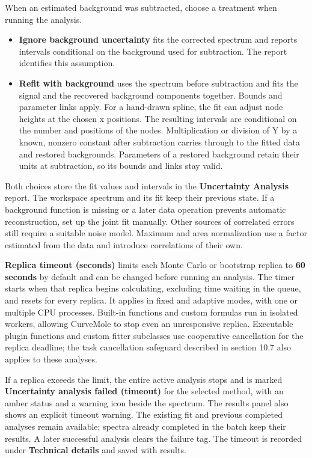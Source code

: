 \documentclass[
  10pt,
  a4paper,
  oneside]{scrreprt}
\providecommand{\tightlist}{%
  \setlength{\itemsep}{0pt}\setlength{\parskip}{0pt}}
\begin{document}
When an estimated background was subtracted, choose a treatment when
running the analysis.

\begin{itemize}
\tightlist
\item
  \textbf{Ignore background uncertainty} fits the corrected spectrum and
  reports intervals conditional on the background used for subtraction.
  The report identifies this assumption.
\item
  \textbf{Refit with background} uses the spectrum before subtraction
  and fits the signal and the recovered background components together.
  Bounds and parameter links apply. For a hand-drawn spline, the fit can
  adjust node heights at the chosen x positions. The resulting intervals
  are conditional on the number and positions of the nodes.
  Multiplication or division of Y by a known, nonzero constant after
  subtraction carries through to the fitted data and restored
  backgrounds. Parameters of a restored background retain their units at
  subtraction, so its bounds and links stay valid.
\end{itemize}

Both choices store the fit values and intervals in the
\textbf{Uncertainty Analysis} report. The workspace spectrum and its fit
keep their previous state. If a background function is missing or a
later data operation prevents automatic reconstruction, set up the joint
fit manually. Other sources of correlated errors still require a
suitable noise model. Maximum and area normalization use a factor
estimated from the data and introduce correlations of their own.

\textbf{Replica timeout (seconds)} limits each Monte Carlo or bootstrap
replica to \textbf{60 seconds} by default and can be changed before
running an analysis. The timer starts when that replica begins
calculating, excluding time waiting in the queue, and resets for every
replica. It applies in fixed and adaptive modes, with one or multiple
CPU processes. Built-in functions and custom formulas run in isolated
workers, allowing CurveMole to stop even an unresponsive replica.
Executable plugin functions and custom fitter subclasses use cooperative
cancellation for the replica deadline; the task cancellation safeguard
described in section 10.7 also applies to these analyses.

If a replica exceeds the limit, the entire active analysis stops and is
marked \textbf{Uncertainty analysis failed (timeout)} for the selected
method, with an amber status and a warning icon beside the spectrum. The
results panel also shows an explicit timeout warning. The existing fit
and previous completed analyses remain available; spectra already
completed in the batch keep their results. A later successful analysis
clears the failure tag. The timeout is recorded under \textbf{Technical
details} and saved with results.
\end{document}
